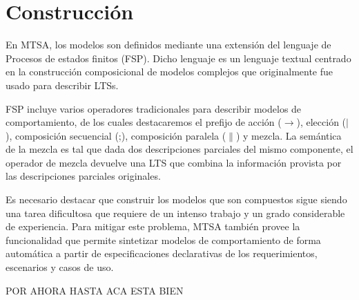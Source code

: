 \section{Construcción}

En MTSA, los modelos son definidos mediante una extensión del lenguaje de Procesos de estados finitos (FSP). Dicho
lenguaje es un lenguaje textual centrado en la construcción composicional de modelos complejos que originalmente fue
usado para describir LTSs.

FSP incluye varios operadores tradicionales para describir modelos de comportamiento, de los cuales destacaremos el
prefijo de acción ($\rightarrow$), elección ($|$), composición secuencial (;), composición paralela ($\|$) y mezcla.
La semántica de la mezcla es tal que dada dos descripciones parciales del mismo componente, el operador de mezcla
devuelve una LTS que combina la información provista por las descripciones parciales originales.

Es necesario destacar que construir los modelos que son compuestos sigue siendo una tarea dificultosa que requiere de un
intenso trabajo y un grado considerable de experiencia. Para mitigar este problema, MTSA también provee la funcionalidad
que permite sintetizar modelos de comportamiento de forma automática a partir de especificaciones declarativas de los
requerimientos, escenarios y casos de uso.

POR AHORA HASTA ACA ESTA BIEN
